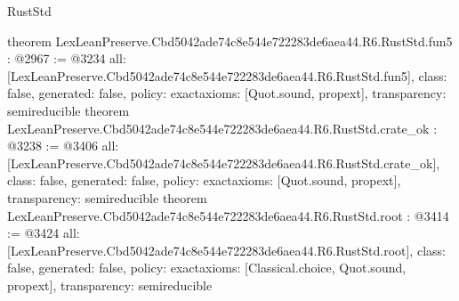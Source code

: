 \begin{lexlean}{RustStd}
\begin{coremodule}
{}
theorem LexLeanPreserve.Cbd5042ade74c8e544e722283de6aea44.R6.RustStd.fun5 : @2967 := @3234 {
  all: [LexLeanPreserve.Cbd5042ade74c8e544e722283de6aea44.R6.RustStd.fun5],
  class: false,
  generated: false,
  policy: exact{axioms: [Quot.sound, propext]},
  transparency: semireducible
}
theorem LexLeanPreserve.Cbd5042ade74c8e544e722283de6aea44.R6.RustStd.crate_ok : @3238 := @3406 {
  all: [LexLeanPreserve.Cbd5042ade74c8e544e722283de6aea44.R6.RustStd.crate_ok],
  class: false,
  generated: false,
  policy: exact{axioms: [Quot.sound, propext]},
  transparency: semireducible
}
theorem LexLeanPreserve.Cbd5042ade74c8e544e722283de6aea44.R6.RustStd.root : @3414 := @3424 {
  all: [LexLeanPreserve.Cbd5042ade74c8e544e722283de6aea44.R6.RustStd.root],
  class: false,
  generated: false,
  policy: exact{axioms: [Classical.choice, Quot.sound, propext]},
  transparency: semireducible
}


\end{coremodule}
\end{lexlean}
